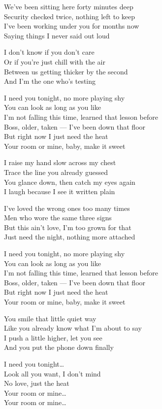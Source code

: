 \begin{lyrics}
We've been sitting here forty minutes deep\\
Security checked twice, nothing left to keep\\
I've been working under you for months now\\
Saying things I never said out loud

I don't know if you don't care\\
Or if you're just chill with the air\\
Between us getting thicker by the second\\
And I'm the one who's testing

I need you tonight, no more playing shy\\
You can look as long as you like\\
I'm not falling this time, learned that lesson before\\
Boss, older, taken — I've been down that floor\\
But right now I just need the heat\\
Your room or mine, baby, make it sweet

I raise my hand slow across my chest\\
Trace the line you already guessed\\
You glance down, then catch my eyes again\\
I laugh because I see it written plain

I've loved the wrong ones too many times\\
Men who wore the same three signs\\
But this ain't love, I'm too grown for that\\
Just need the night, nothing more attached

I need you tonight, no more playing shy\\
You can look as long as you like\\
I'm not falling this time, learned that lesson before\\
Boss, older, taken — I've been down that floor\\
But right now I just need the heat\\
Your room or mine, baby, make it sweet

You smile that little quiet way\\
Like you already know what I'm about to say\\
I push a little higher, let you see\\
And you put the phone down finally

I need you tonight…\\
Look all you want, I don't mind\\
No love, just the heat\\
Your room or mine…\\
Your room or mine…
\end{lyrics}

